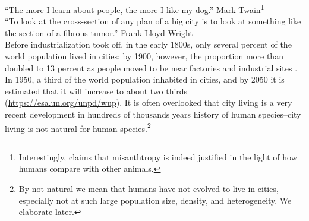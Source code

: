 \documentclass[10pt, letterpaper]{article}
\newcommand{\emd}[1]{\ExecuteMetaData[/tmp/tex]{#1}} %
\begin{document}
\begin{spacing}{1.4} %
\vspace{.5in}

\noindent ``The more I learn about people, the more I like my dog.'' Mark
Twain\footnote{Interestingly, \citet{cooper2018animals} claims that misanthtropy is indeed justified in the light of how humans %
  compare with other animals.}\\

\noindent ``To look at the
 cross-section of any plan of a big city is to look at something like the
 section of a fibrous tumor.'' Frank Lloyd Wright\\


Before industrialization took off, in the early 1800s, only several percent of the world population lived in cities; by 1900, however, the proportion more than
doubled to 13 percent as people moved to be near factories and industrial sites
\citep{davis55}. In 1950, a third of the world population inhabited in cities,
and by 2050 it is estimated that it will increase to about two thirds
(\url{https://esa.un.org/unpd/wup}).
 It is often overlooked  that city living is a very recent development in
 hundreds of thousands years history of human species--city living is not
 natural for human species.\footnote{By not natural we mean that humans have not
   evolved to live in cities, especially not at such large population size,
   density, and heterogeneity. We elaborate later.}


\end{spacing}
\end{document}
